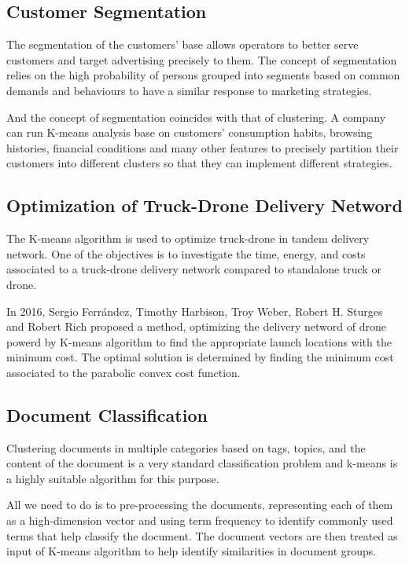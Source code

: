 \documentclass[11pt]{article}
\begin{document}
\subsection{Customer Segmentation}
The segmentation of the customers’ base allows operators to better serve customers and target advertising precisely to them\cite{Bcil2012PrepaidTC}.
The concept of segmentation relies on the high probability of persons grouped into segments based on common demands and behaviours to have a similar response to marketing strategies.
\par And the concept of segmentation coincides with that of clustering. A company can run K-means analysis base on customers' consumption habits, browsing histories, financial conditions and many other features to precisely partition their customers into different clusters so that they can implement different strategies.\cite{Bcil2012PrepaidTC}
\subsection{Optimization of Truck-Drone Delivery Netword}
The K-means algorithm is used to optimize truck-drone in tandem delivery network. One of the objectives is to investigate the time, energy, and costs associated to a truck-drone delivery network compared to standalone truck or drone. 
\par In 2016, Sergio Ferr{\'a}ndez, Timothy Harbison, Troy Weber, Robert H. Sturges and Robert Rich proposed a method\cite{Ferrndez2016OptimizationOA}, optimizing the delivery netword of drone powerd by K-means algorithm to find the appropriate launch locations with the  minimum cost.  The optimal solution is determined by finding the minimum cost associated to the parabolic convex cost function.
\subsection{Document Classification}
Clustering documents in multiple categories based on tags, topics, and the content of the document is a very standard classification problem and k-means is a highly suitable algorithm for this purpose.\cite{kmeansapplication}
\par All we need to do is to pre-processing the documents, representing each of them as a high-dimension vector and using term frequency to identify commonly used terms that help classify the document.
The document vectors are then treated as input of K-means algorithm to help identify similarities in document groups.\cite{Jacob2016ImprovedCO}
\end{document}
